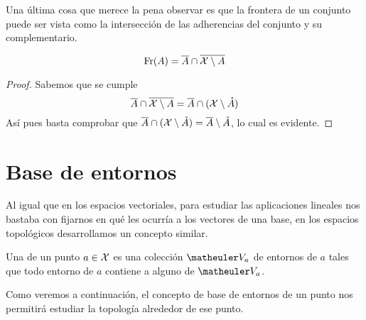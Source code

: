 Una última cosa que merece la pena observar es que la frontera de un conjunto puede ser vista como la intersección de las adherencias del conjunto y su complementario.
\begin{lem}
	\begin{equation*}
		\operatorname{\mathrm{Fr}}(A)=\overline{A}\cap\overline{\mathcal{X} \setminus A}
	\end{equation*}
\end{lem}
\begin{proof}
	Sabemos que se cumple
	\begin{equation*}
		\overline{A}\cap\overline{\mathcal{X} \setminus A}=\overline{A}\cap(\mathcal{X} \setminus \mathring{A})
	\end{equation*}
	Así pues basta comprobar que $\overline{A}\cap(\mathcal{X} \setminus \mathring{A})=\overline{A}\setminus \mathring{A}$, lo cual es evidente.
\end{proof}

\section{Base de entornos}
Al igual que en los espacios vectoriales, para estudiar las aplicaciones lineales nos bastaba con fijarnos en qué les ocurría a los vectores de una base, en los espacios topológicos desarrollamos un concepto similar.
\begin{defi}
	\label{etop_bases_entornos}
	Una  de un punto $a\in\mathcal{X}$ es una colección $\Va{a}$ de entornos de $a$ tales que todo entorno de $a$ contiene a alguno de $\Va{a}$.
\end{defi}

Como veremos a continuación, el concepto de base de entornos de un punto nos permitirá estudiar la topología alrededor de ese punto.

